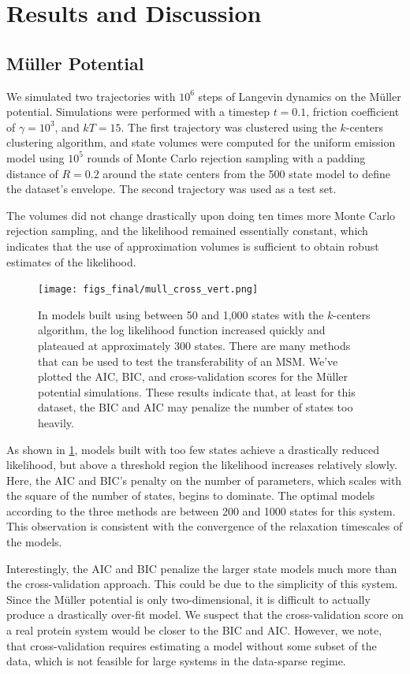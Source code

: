 \documentclass[twocolumn,floatfix,nofootinbib,aps]{revtex4-1}
\begin{document}
\section{Results and Discussion}
\subsection{M\"{u}ller Potential}
We simulated two trajectories with $10^6$ steps of Langevin dynamics on the M\"{u}ller potential\cite{}. Simulations were performed with a timestep $t=0.1$, friction coefficient of $\gamma=10^3$, and $kT=15$. The first trajectory was clustered using the $k$-centers clustering algorithm, and state volumes were computed for the uniform emission model using $10^5$ rounds of Monte Carlo rejection sampling with a padding distance of $R=0.2$ around the state centers from the 500 state model to define the dataset's envelope. The second trajectory was used as a test set.

The volumes did not change drastically upon doing ten times more Monte Carlo rejection sampling, and the likelihood remained essentially constant, which indicates that the use of approximation volumes is sufficient to obtain robust estimates of the likelihood. 

\begin{figure}[h]
\centering
\texttt{[image: figs\_final/mull\_cross\_vert.png]}
\caption{In models built using between 50 and 1,000 states with the $k$-centers algorithm, the log likelihood function increased quickly and plateaued at approximately 300 states. There are many methods that can be used to test the transferability of an MSM. We've plotted the AIC, BIC, and cross-validation scores for the M\"uller potential simulations. These results indicate that, at least for this dataset, the BIC and AIC may penalize the number of states too heavily.}
\label{fig:mullerlike}
\end{figure}

As shown in \cref{fig:mullerlike}, models built with too few states achieve a drastically reduced likelihood, but above a threshold region the likelihood increases relatively slowly. Here, the AIC and BIC's penalty on the number of parameters, which scales with the square of the number of states, begins to dominate. The optimal models according to the three methods are between 200 and 1000 states for this system. This observation is consistent with the convergence of the relaxation timescales of the models.

Interestingly, the AIC and BIC penalize the larger state models much more than the cross-validation approach. This could be due to the simplicity of this system. Since the M\"uller potential is only two-dimensional, it is difficult to actually produce a drastically over-fit model. We suspect that the cross-validation score on a real protein system would be closer to the BIC and AIC. However, we note, that cross-validation requires estimating a model without some subset of the data, which is not feasible for large systems in the data-sparse regime.
\end{document}
